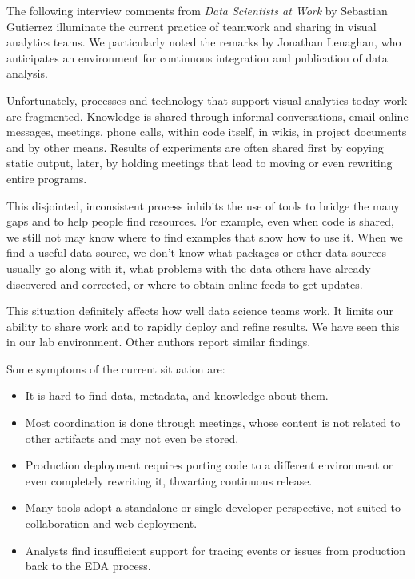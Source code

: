 The following interview comments from
{\it Data Scientists at Work}
by Sebastian Gutierrez illuminate the current practice of teamwork
and sharing in visual analytics teams.
We particularly noted the remarks by
Jonathan Lenaghan, who anticipates an environment for continuous
integration and publication of data analysis.

\begin{addmargin}[1em]{1em}  %
\small

\end{addmargin}


Unfortunately, processes and technology that support visual analytics today
work are fragmented.
Knowledge is shared through informal conversations, email online messages,
meetings, phone calls, within code itself, in wikis, in project documents and
by other means. Results of experiments are often shared first by copying static
output, later, by holding meetings that lead to moving or even rewriting
entire programs.

This disjointed, inconsistent process inhibits the use of tools to bridge
the many gaps and to help people find resources.
For example, even when code is shared, we still not may know where to
find examples that show how to use it.
When we find a useful data source, we don't know what packages or
other data sources usually go along with it, what problems with the data
others have already discovered and corrected, or where to obtain online feeds
to get updates.

This situation definitely affects how well data science teams work.
It limits our ability to share work and to rapidly deploy and refine results.
We have seen this in our lab environment.
Other authors report similar findings.

Some symptoms of the current situation are:
\begin{itemize}
\item It is hard to find data, metadata, and knowledge about them.
\item Most coordination is done through meetings, whose content is not related to other artifacts and may not even be stored.
\item Production deployment requires porting code to a different environment or even completely rewriting it, thwarting continuous release.
\item Many tools adopt a standalone or single developer perspective,
not suited to collaboration and web deployment. 
\item Analysts find insufficient support for tracing events or issues from production back to the EDA process.
\end{itemize}

